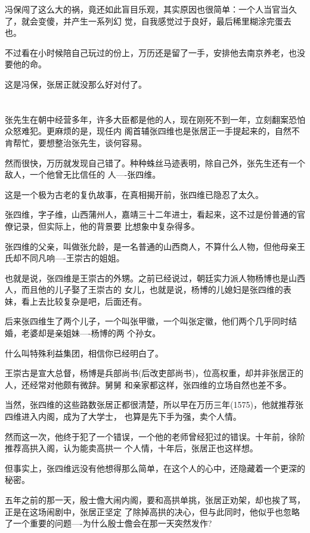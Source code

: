 \documentclass[11pt,a4paper,onecolumn]{article}
\begin{document}
冯保闯了这么大的祸，竟还如此盲目乐观，其实原因也很简单：一个人当官当久了，就会变傻，并产生一系列幻
觉，自我感觉过于良好，最后稀里糊涂完蛋去也。

不过看在小时候陪自己玩过的份上，万历还是留了一手，安排他去南京养老，也没要他的命。

这是冯保，张居正就没那么好对付了。

\section[\thesection]{}

张先生在朝中经营多年，许多大臣都是他的人，现在刚死不到一年，立刻翻案恐怕众怒难犯。更麻烦的是，现任内
阁首辅张四维也是张居正一手提起来的，自然不肯帮忙，要想整治张先生，谈何容易。

然而很快，万历就发现自己错了。种种蛛丝马迹表明，除自己外，张先生还有一个敌人，一个他曾无比信任的
人----张四维。

这是一个极为古老的复仇故事，在真相揭开前，张四维已隐忍了太久。

张四维，字子维，山西蒲州人，嘉靖三十二年进士，看起来，这不过是份普通的官僚记录，但实际上，他的背景要
比想象中复杂得多。

张四维的父亲，叫做张允龄，是一名普通的山西商人，不算什么人物，但他母亲王氏却不同凡响----王崇古的姐姐。

也就是说，张四维是王崇古的外甥。之前已经说过，朝廷实力派人物杨博也是山西人，而且他的儿子娶了王崇古的
女儿，也就是说，杨博的儿媳妇是张四维的表妹，看上去比较复杂是吧，后面还有。

后来张四维生了两个儿子，一个叫张甲徽，一个叫张定徽，他们两个几乎同时结婚，老婆却是亲姐妹----杨博的两
个孙女。

什么叫特殊利益集团，相信你已经明白了。

王崇古是宣大总督，杨博是兵部尚书(后改吏部尚书)，位高权重，却并非张居正的人，还经常对他颇有微辞。舅舅
和亲家都这样，张四维的立场自然也差不多。

当然，张四维的这些路数张居正都很清楚，所以早在万历三年(1575)，他就推荐张四维进入内阁，成为了大学士，
也算是先下手为强，卖个人情。

然而这一次，他终于犯了一个错误，一个他的老师曾经犯过的错误。十年前，徐阶推荐高拱入阁，认为能卖高拱一
个人情，十年后，张居正也这样想。

但事实上，张四维远没有他想得那么简单，在这个人的心中，还隐藏着一个更深的秘密。

五年之前的那一天，殷士儋大闹内阁，要和高拱单挑，张居正劝架，却也挨了骂，正是在这场闹剧中，张居正坚定
了除掉高拱的决心，但与此同时，他似乎也忽略了一个重要的问题----为什么殷士儋会在那一天突然发作?
\end{document}
